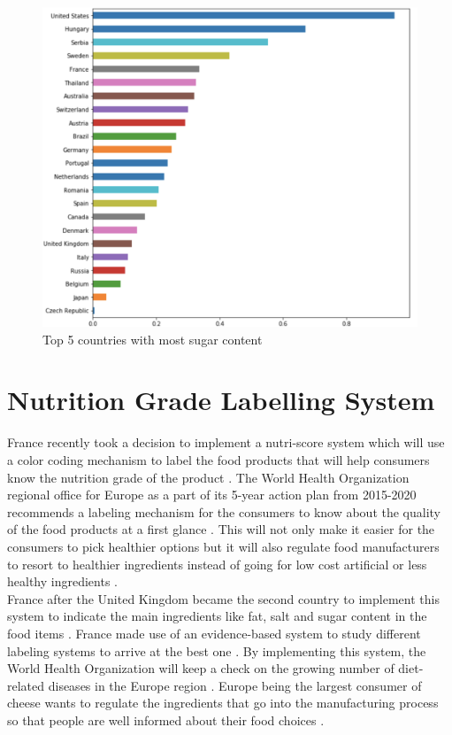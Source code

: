 \documentclass[sigconf]{acmart}
\begin{document}
\begin{figure}
\includegraphics[width=1.0\columnwidth]{images/fig13.png}
\caption{Top 5 countries with most sugar content \cite{code-base}}
\label{fig:Fig13}
\end{figure} 

\section{Nutrition Grade Labelling System}
France recently took a decision to implement a nutri-score system which will use a color coding mechanism to label the food products that will help consumers know the nutrition grade of the product \cite{www-who}. The World Health Organization regional office for Europe as a part of its 5-year action plan from 2015-2020 recommends a labeling mechanism for the consumers to know about the quality of the food products at a first glance \cite{www-who}. This will not only make it easier for the consumers to pick healthier options but it will also regulate food manufacturers to resort to healthier ingredients instead of going for low cost artificial or less healthy ingredients \cite{www-who}.  \\

France after the United Kingdom became the second country to implement this system to indicate the main ingredients like fat, salt and sugar content in the food items \cite{www-who}. France made use of an evidence-based system to study different labeling systems to arrive at the best one \cite{www-who}. By implementing this system, the World Health Organization will keep a check on the growing number of diet-related diseases in the Europe region \cite{www-who}. Europe being the largest consumer of cheese wants to regulate the ingredients that go into the manufacturing process so that people are well informed about their food choices \cite{www-who}.
\end{document}
